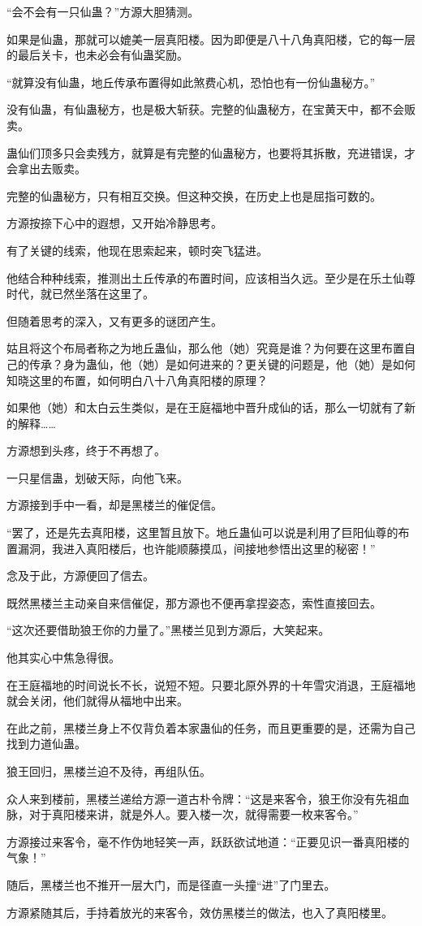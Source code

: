 \begin{this_body}
“会不会有一只仙蛊？”方源大胆猜测。

如果是仙蛊，那就可以媲美一层真阳楼。因为即便是八十八角真阳楼，它的每一层的最后关卡，也未必会有仙蛊奖励。

“就算没有仙蛊，地丘传承布置得如此煞费心机，恐怕也有一份仙蛊秘方。”

没有仙蛊，有仙蛊秘方，也是极大斩获。完整的仙蛊秘方，在宝黄天中，都不会贩卖。

蛊仙们顶多只会卖残方，就算是有完整的仙蛊秘方，也要将其拆散，充进错误，才会拿出去贩卖。

完整的仙蛊秘方，只有相互交换。但这种交换，在历史上也是屈指可数的。

方源按捺下心中的遐想，又开始冷静思考。

有了关键的线索，他现在思索起来，顿时突飞猛进。

他结合种种线索，推测出土丘传承的布置时间，应该相当久远。至少是在乐土仙尊时代，就已然坐落在这里了。

但随着思考的深入，又有更多的谜团产生。

姑且将这个布局者称之为地丘蛊仙，那么他（她）究竟是谁？为何要在这里布置自己的传承？身为蛊仙，他（她）是如何进来的？更关键的问题是，他（她）是如何知晓这里的布置，如何明白八十八角真阳楼的原理？

如果他（她）和太白云生类似，是在王庭福地中晋升成仙的话，那么一切就有了新的解释……

方源想到头疼，终于不再想了。

一只星信蛊，划破天际，向他飞来。

方源接到手中一看，却是黑楼兰的催促信。

“罢了，还是先去真阳楼，这里暂且放下。地丘蛊仙可以说是利用了巨阳仙尊的布置漏洞，我进入真阳楼后，也许能顺藤摸瓜，间接地参悟出这里的秘密！”

念及于此，方源便回了信去。

既然黑楼兰主动亲自来信催促，那方源也不便再拿捏姿态，索性直接回去。

“这次还要借助狼王你的力量了。”黑楼兰见到方源后，大笑起来。

他其实心中焦急得很。

在王庭福地的时间说长不长，说短不短。只要北原外界的十年雪灾消退，王庭福地就会关闭，他们就得从福地中出来。

在此之前，黑楼兰身上不仅背负着本家蛊仙的任务，而且更重要的是，还需为自己找到力道仙蛊。

狼王回归，黑楼兰迫不及待，再组队伍。

众人来到楼前，黑楼兰递给方源一道古朴令牌：“这是来客令，狼王你没有先祖血脉，对于真阳楼来讲，就是外人。要入楼一次，就得需要一枚来客令。”

方源接过来客令，毫不作伪地轻笑一声，跃跃欲试地道：“正要见识一番真阳楼的气象！”

随后，黑楼兰也不推开一层大门，而是径直一头撞“进”了门里去。

方源紧随其后，手持着放光的来客令，效仿黑楼兰的做法，也入了真阳楼里。

\end{this_body}

